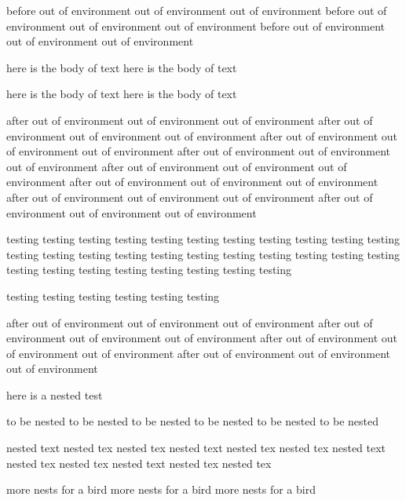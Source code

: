 before out of environment out of environment out of environment
before out of environment out of environment out of environment
before out of environment out of environment out of environment
\begin{myenvironment}

  here is the body of text
  here is the body of text

  here is the body of text
  here is the body of text

\end{myenvironment}
after out of environment out of environment out of environment
after out of environment out of environment out of environment
after out of environment out of environment out of environment
after out of environment out of environment out of environment
after out of environment out of environment out of environment
after out of environment out of environment out of environment
after out of environment out of environment out of environment
after out of environment out of environment out of environment
\begin{anothertest}

  testing testing testing testing testing testing
  testing testing testing testing testing testing
  testing testing testing testing testing testing
  testing testing testing testing testing testing
  testing testing testing testing testing testing

  
  testing testing testing testing testing testing

\end{anothertest}
after out of environment out of environment out of environment
after out of environment out of environment out of environment
after out of environment out of environment out of environment
after out of environment out of environment out of environment


here is a nested test
\begin{nestedenv}
  to be nested to be nested
  to be nested to be nested
  to be nested to be nested
  \begin{thenestedenv}
    nested text nested tex nested tex
    nested text nested tex nested tex
    nested text nested tex nested tex
    nested text nested tex nested tex
    \begin{anothernest}
      more nests for a bird
      more nests for a bird
      more nests for a bird
    \end{anothernest}
  \end{thenestedenv}
\end{nestedenv}
